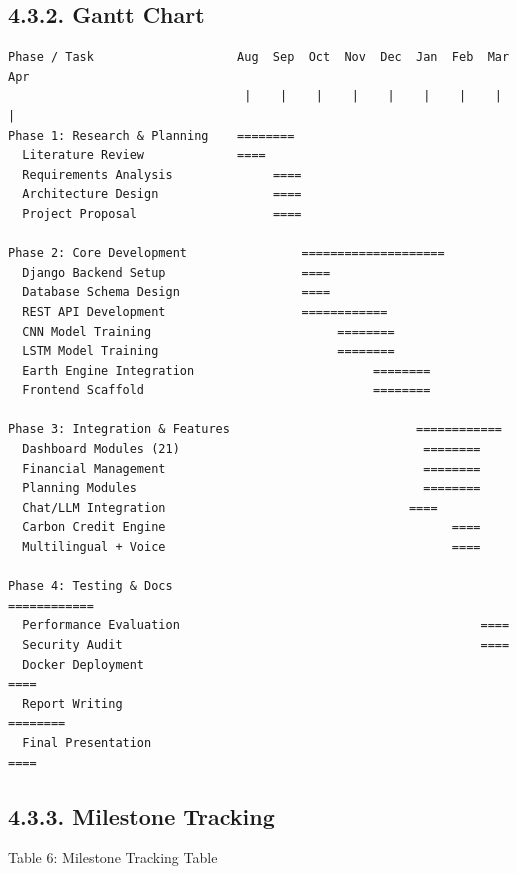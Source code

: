 \documentclass[12pt, a4paper]{report}
\begin{document}
\subsection{4.3.2. Gantt Chart}
\begin{Verbatim}[fontsize=\small]
Phase / Task                    Aug  Sep  Oct  Nov  Dec  Jan  Feb  Mar  Apr
                                 |    |    |    |    |    |    |    |    |
Phase 1: Research & Planning    ========
  Literature Review             ====
  Requirements Analysis              ====
  Architecture Design                ====
  Project Proposal                   ====

Phase 2: Core Development                ====================
  Django Backend Setup                   ====
  Database Schema Design                 ====
  REST API Development                   ============
  CNN Model Training                          ========
  LSTM Model Training                         ========
  Earth Engine Integration                         ========
  Frontend Scaffold                                ========

Phase 3: Integration & Features                          ============
  Dashboard Modules (21)                                  ========
  Financial Management                                    ========
  Planning Modules                                        ========
  Chat/LLM Integration                                  ====
  Carbon Credit Engine                                        ====
  Multilingual + Voice                                        ====

Phase 4: Testing & Docs                                          ============
  Performance Evaluation                                          ====
  Security Audit                                                  ====
  Docker Deployment                                                    ====
  Report Writing                                                  ========
  Final Presentation                                                   ====
\end{Verbatim}
\subsection{4.3.3. Milestone Tracking}
Table 6: Milestone Tracking Table
\end{document}
